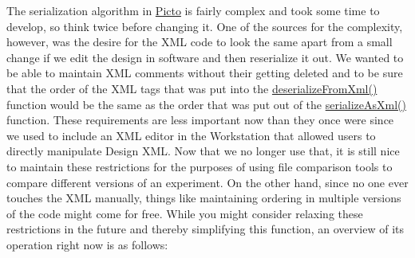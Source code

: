 The serialization algorithm in \hyperlink{namespace_picto}{Picto} is fairly complex and took some time to develop, so think twice before changing it. One of the sources for the complexity, however, was the desire for the X\-M\-L code to look the same apart from a small change if we edit the design in software and then reserialize it out. We wanted to be able to maintain X\-M\-L comments without their getting deleted and to be sure that the order of the X\-M\-L tags that was put into the \hyperlink{class_picto_1_1_data_store_a37bb8f90b4d8c2e12970a276e6a6ec91}{deserialize\-From\-Xml()} function would be the same as the order that was put out of the \hyperlink{class_picto_1_1_data_store_a691063f5662f5db9c48deabc0f2e972b}{serialize\-As\-Xml()} function. These requirements are less important now than they once were since we used to include an X\-M\-L editor in the Workstation that allowed users to directly manipulate Design X\-M\-L. Now that we no longer use that, it is still nice to maintain these restrictions for the purposes of using file comparison tools to compare different versions of an experiment. On the other hand, since no one ever touches the X\-M\-L manually, things like maintaining ordering in multiple versions of the code might come for free. While you might consider relaxing these restrictions in the future and thereby simplifying this function, an overview of its operation right now is as follows\-:
